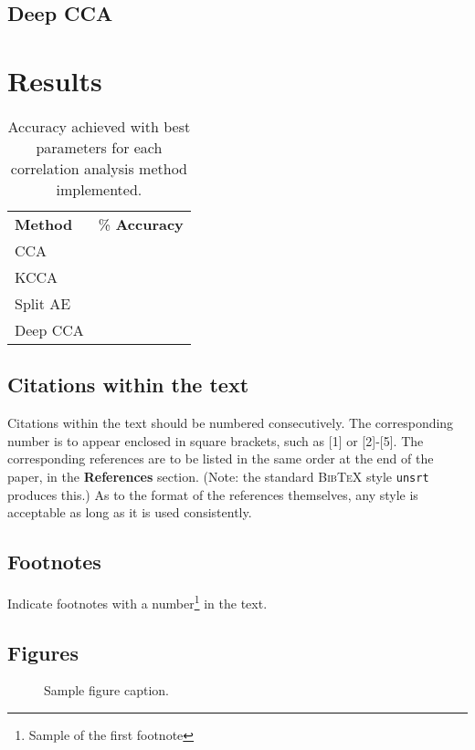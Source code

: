 \documentclass{article} %
\begin{document}
\subsection{Deep CCA}



\section{Results}


\begin{table}[]
\centering
\label{my-label}
\begin{tabular}{ll}
\textbf{Method}   & \% \textbf{Accuracy} \\
CCA      &             \\
KCCA     &             \\
Split AE &             \\
Deep CCA &            
\end{tabular}
\caption{Accuracy achieved with best parameters for each correlation analysis method implemented.}
\end{table}


\subsection{Citations within the text}

Citations within the text should be numbered consecutively. The corresponding
number is to appear enclosed in square brackets, such as [1] or [2]-[5]. The
corresponding references are to be listed in the same order at the end of the
paper, in the \textbf{References} section. (Note: the standard
\textsc{Bib\TeX} style \texttt{unsrt} produces this.) As to the format of the
references themselves, any style is acceptable as long as it is used
consistently.



\subsection{Footnotes}

Indicate footnotes with a number\footnote{Sample of the first footnote} in the
text.

\subsection{Figures}

\begin{figure}[h]
\begin{center}
\fbox{\rule[-.5cm]{0cm}{4cm} \rule[-.5cm]{4cm}{0cm}}
\end{center}
\caption{Sample figure caption.}
\end{figure}
\end{document}
